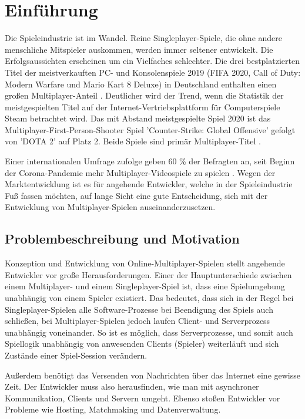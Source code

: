 \chapter{Einführung}
\label{sec:einfuehrung}

Die Spieleindustrie ist im Wandel. Reine Singleplayer-Spiele, die ohne andere menschliche Mitspieler auskommen, werden immer seltener entwickelt. Die Erfolgsaussichten erscheinen um ein Vielfaches schlechter. Die drei bestplatzierten Titel der meistverkauften PC- und Konsolenspiele 2019 (FIFA 2020, Call of Duty: Modern Warfare und Mario Kart 8 Deluxe) in Deutschland enthalten einen großen Multiplayer-Anteil \cite{gameVerbandderdeutschenGamesBranchee.V..2020}. Deutlicher wird der Trend, wenn die Statistik der meistgespielten Titel auf der Internet-Vertriebsplattform für Computerspiele Steam betrachtet wird. Das mit Abstand meistgespielte Spiel 2020 ist das Multiplayer-First-Person-Shooter Spiel 'Counter-Strike: Global Offensive' gefolgt von 'DOTA 2' auf Platz 2. Beide Spiele sind primär Multiplayer-Titel \cite{GitHyp.February2021}.

Einer internationalen Umfrage zufolge geben 60 \% der Befragten an, seit Beginn der Corona-Pandemie mehr Multiplayer-Videospiele zu spielen \cite{SimonKucher&Partners.2020}. Wegen der Marktentwicklung ist es für angehende Entwickler, welche in der Spieleindustrie Fuß fassen möchten, auf lange Sicht eine gute Entscheidung, sich mit der Entwicklung von Multiplayer-Spielen auseinanderzusetzen.

\section{Problembeschreibung und Motivation}

Konzeption und Entwicklung von Online-Multiplayer-Spielen stellt angehende Entwickler vor große Herausforderungen. Einer der Hauptunterschiede zwischen einem Multiplayer- und einem Singleplayer-Spiel ist, dass eine Spielumgebung unabhängig von einem Spieler existiert. Das bedeutet, dass sich in der Regel bei Singleplayer-Spielen alle Software-Prozesse bei Beendigung des Spiels auch schließen, bei Multiplayer-Spielen jedoch laufen Client- und Serverprozess unabhängig voneinander. So ist es möglich, dass Serverprozesse, und somit auch Spiellogik unabhängig von anwesenden Clients (Spieler) weiterläuft und sich Zustände einer Spiel-Session verändern. 

Außerdem benötigt das Versenden von Nachrichten über das Internet eine gewisse Zeit. Der Entwickler muss also herausfinden, wie man mit asynchroner Kommunikation, Clients und Servern umgeht. Ebenso stoßen Entwickler vor Probleme wie Hosting, Matchmaking und Datenverwaltung.
\cite{Payne.18.09.2019}

